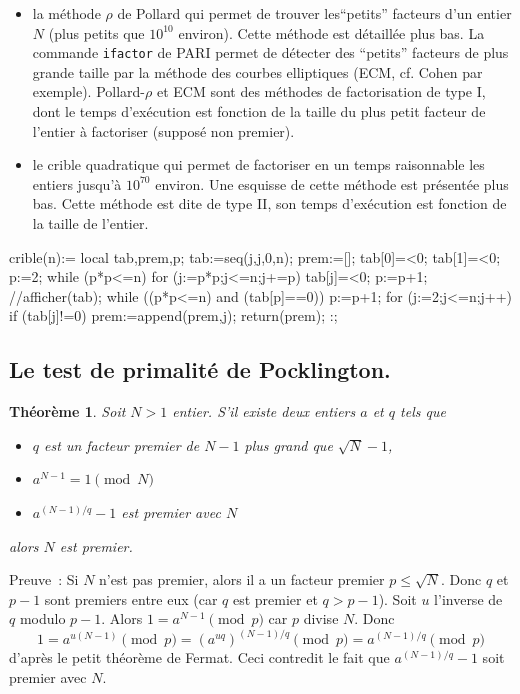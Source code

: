 \documentclass[a4paper,11pt]{article}
\newtheorem{thm}{Théorème}
\begin{document}
\begin{giacjshere}
\begin{itemize}
utiliser le test de Pocklington (voir la section
d\'edi\'ee) ou le test APRCL via PARI.
\item la m\'ethode $\rho$ de Pollard qui permet de trouver
les``petits'' facteurs d'un entier $N$ (plus petits que
$10^{10}$ environ). Cette m\'ethode est d\'etaill\'ee plus bas.
La commande \verb|ifactor| de PARI permet de d\'etecter
des ``petits'' facteurs de plus grande taille par la m\'ethode
des courbes elliptiques (ECM, cf. Cohen par exemple). Pollard-$\rho$
et ECM sont des m\'ethodes de factorisation de type I, dont le
temps d'ex\'ecution est fonction de la taille du plus petit facteur
de l'entier \`a factoriser (suppos\'e non premier).
\item le crible quadratique qui permet de factoriser
en un temps raisonnable les entiers jusqu'\`a $10^{70}$ environ.
Une esquisse de cette m\'ethode est pr\'esent\'ee plus bas.
Cette m\'ethode est dite de type II, son temps d'ex\'ecution
est fonction de la taille de l'entier.
\end{itemize}
\begin{giacprog}
crible(n):={
  local tab,prem,p;
  tab:=seq(j,j,0,n);
  prem:=[];
  tab[0]=<0; tab[1]=<0;
  p:=2;
  while (p*p<=n) {
    for (j:=p*p;j<=n;j+=p){
      tab[j]=<0;
    }
    p:=p+1;
    //afficher(tab);
    while ((p*p<=n) and (tab[p]==0)) {
      p:=p+1;
    } 
  }
  for (j:=2;j<=n;j++) {
    if (tab[j]!=0) { 
      prem:=append(prem,j);
    }
  } 
  return(prem);
}:;
\end{giacprog}

\subsection{Le test de primalit\'e de Pocklington.} 
\begin{thm}
Soit $N>1$ entier. S'il existe deux entiers $a$ et $q$ tels que
\begin{itemize}
\item $q$ est un facteur premier de $N-1$ plus grand que $\sqrt{N}-1$,
\item $a^{N-1}=1 \pmod N$
\item $a^{(N-1)/q}-1$ est premier avec $N$
\end{itemize}
alors $N$ est premier.
\end{thm}
Preuve~: Si $N$ n'est pas premier, alors il a un facteur premier
$p\leq \sqrt{N}$. Donc $q$ et $p-1$ sont premiers entre eux
(car $q$ est premier et $q>p-1$). Soit $u$ l'inverse de $q$ modulo
$p-1$. Alors $1=a^{N-1} \pmod p$ car $p$ divise $N$. Donc
$$ 1=a^{u(N-1)} \pmod p = \left(a^{uq}\right)^{(N-1)/q} \pmod p =
a^{(N-1)/q} \pmod p$$
d'apr\`es le petit th\'eor\`eme de Fermat. Ceci contredit 
le fait que $a^{(N-1)/q}-1$ soit premier avec $N$.


\end{giacjshere}
\end{document}
